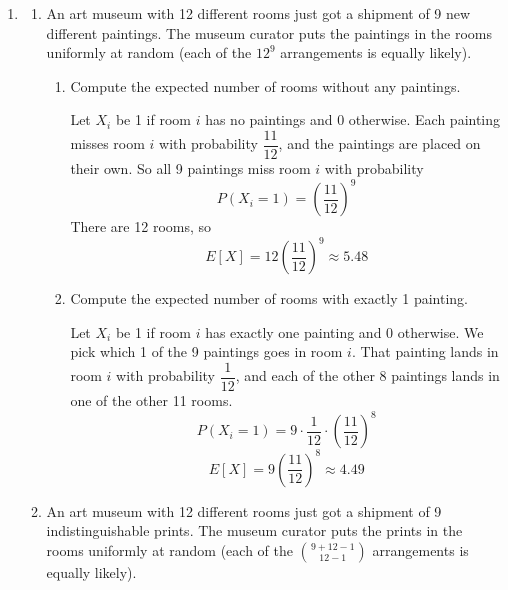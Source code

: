 \documentclass{article}
\begin{document}
\begin{enumerate}
\begin{enumerate}
        For each pair $i < j$, let $X_{ij}$ be 1 if $a_i = j$ and $a_j = i$, and 0 otherwise.
        Position $i$ can be any of the $n$ values, so $P(a_i = j) = \dfrac{1}{n}$.
        Then position $j$ can be any of the remaining $n-1$ values, so $P(a_j = i \mid a_i = j) = \dfrac{1}{n-1}$.
        \[
        P(X_{ij} = 1) = \frac{1}{n} \cdot \frac{1}{n-1} = \frac{1}{n(n-1)}
        \]
        There are $\binom{n}{2}$ pairs with $i < j$, so
        \[
        \boxed{E[X] = \binom{n}{2} \cdot \frac{1}{n(n-1)} = \frac{1}{2}}
        \]
    \end{enumerate}

    \item
    \begin{enumerate}
        \item An art museum with 12 different rooms just got a shipment of 9 new different paintings. The museum curator puts the paintings in the rooms uniformly at random (each of the $12^9$ arrangements is equally likely).

        \begin{enumerate}
            \item Compute the expected number of rooms without any paintings.

            Let $X_i$ be 1 if room $i$ has no paintings and 0 otherwise.
            Each painting misses room $i$ with probability $\dfrac{11}{12}$, and the paintings are placed on their own.
            So all 9 paintings miss room $i$ with probability
            \[
            P(X_i = 1) = \left(\frac{11}{12}\right)^9
            \]
            There are 12 rooms, so
            \[
            \boxed{E[X] = 12\left(\frac{11}{12}\right)^9 \approx 5.48}
            \]

            \item Compute the expected number of rooms with exactly 1 painting.

            Let $X_i$ be 1 if room $i$ has exactly one painting and 0 otherwise.
            We pick which 1 of the 9 paintings goes in room $i$. That painting lands in room $i$ with probability $\dfrac{1}{12}$, and each of the other 8 paintings lands in one of the other 11 rooms.
            \[
            P(X_i = 1) = 9 \cdot \frac{1}{12} \cdot \left(\frac{11}{12}\right)^8
            \]
            \[
            \boxed{E[X] = 9\left(\frac{11}{12}\right)^8 \approx 4.49}
            \]
        \end{enumerate}

        \item An art museum with 12 different rooms just got a shipment of 9 indistinguishable prints. The museum curator puts the prints in the rooms uniformly at random (each of the $\binom{9+12-1}{12-1}$ arrangements is equally likely).


\end{enumerate}
\end{enumerate}
\end{document}
